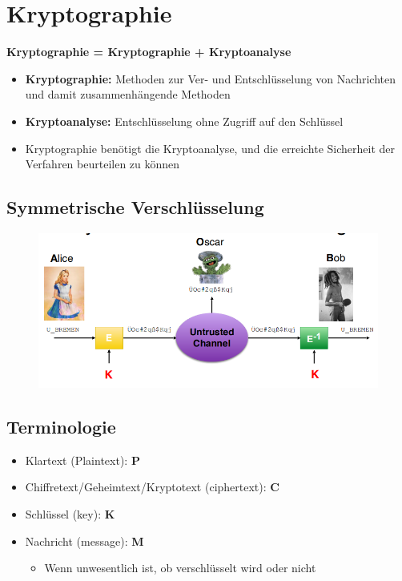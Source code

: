 \documentclass[openany]{book}
\begin{document}
\chapter{Kryptographie}

\textbf{Kryptographie = Kryptographie + Kryptoanalyse}

\begin{itemize}
    \item \textbf{Kryptographie:} Methoden zur Ver- und Entschlüsselung von Nachrichten und damit zusammenhängende Methoden
    \item \textbf{Kryptoanalyse:} Entschlüsselung ohne Zugriff auf den Schlüssel \\
    \item Kryptographie benötigt die Kryptoanalyse, und die erreichte Sicherheit der Verfahren beurteilen zu können
\end{itemize}

\section{Symmetrische Verschlüsselung}

\begin{figure}[h!]
    \centering
    \includegraphics[width=0.85\linewidth]{Pics/Encryption.PNG}
\end{figure}

\newpage

\section{Terminologie}

\begin{itemize}
    \item Klartext (Plaintext): \textbf{P}
    \item Chiffretext/Geheimtext/Kryptotext (ciphertext): \textbf{C}
    \item Schlüssel (key): \textbf{K} \\
    \item Nachricht (message): \textbf{M}
    \begin{itemize}
        \item Wenn unwesentlich ist, ob verschlüsselt wird oder nicht
    \end{itemize}
\end{itemize}
\end{document}
